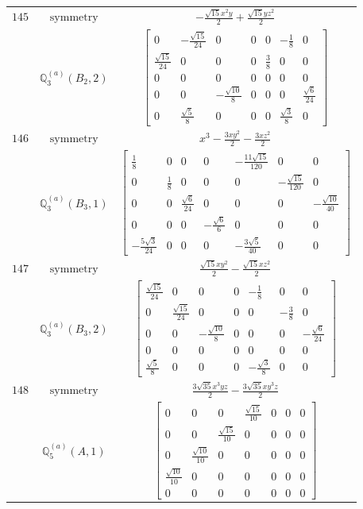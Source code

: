 \documentclass[fleqn,8pt,landscape]{jsarticle}
\begin{document}
\begin{longtable}{ccc}
$ 145 $ & $ \text{symmetry} $ & $ - \frac{\sqrt{15} x^{2} y}{2} + \frac{\sqrt{15} y z^{2}}{2} $ \\
$  $ & $ \mathbb{Q}_{3}^{(a)}(B_{2},2) $ & $ \begin{bmatrix} 0 & - \frac{\sqrt{15}}{24} & 0 & 0 & 0 & - \frac{1}{8} & 0 \\ \frac{\sqrt{15}}{24} & 0 & 0 & 0 & \frac{3}{8} & 0 & 0 \\ 0 & 0 & 0 & 0 & 0 & 0 & 0 \\ 0 & 0 & - \frac{\sqrt{10}}{8} & 0 & 0 & 0 & \frac{\sqrt{6}}{24} \\ 0 & \frac{\sqrt{5}}{8} & 0 & 0 & 0 & \frac{\sqrt{3}}{8} & 0 \end{bmatrix} $ \\ \hline
$ 146 $ & $ \text{symmetry} $ & $ x^{3} - \frac{3 x y^{2}}{2} - \frac{3 x z^{2}}{2} $ \\
$  $ & $ \mathbb{Q}_{3}^{(a)}(B_{3},1) $ & $ \begin{bmatrix} \frac{1}{8} & 0 & 0 & 0 & - \frac{11 \sqrt{15}}{120} & 0 & 0 \\ 0 & \frac{1}{8} & 0 & 0 & 0 & - \frac{\sqrt{15}}{120} & 0 \\ 0 & 0 & \frac{\sqrt{6}}{24} & 0 & 0 & 0 & - \frac{\sqrt{10}}{40} \\ 0 & 0 & 0 & - \frac{\sqrt{6}}{6} & 0 & 0 & 0 \\ - \frac{5 \sqrt{3}}{24} & 0 & 0 & 0 & - \frac{3 \sqrt{5}}{40} & 0 & 0 \end{bmatrix} $ \\ \hline
$ 147 $ & $ \text{symmetry} $ & $ \frac{\sqrt{15} x y^{2}}{2} - \frac{\sqrt{15} x z^{2}}{2} $ \\
$  $ & $ \mathbb{Q}_{3}^{(a)}(B_{3},2) $ & $ \begin{bmatrix} \frac{\sqrt{15}}{24} & 0 & 0 & 0 & - \frac{1}{8} & 0 & 0 \\ 0 & \frac{\sqrt{15}}{24} & 0 & 0 & 0 & - \frac{3}{8} & 0 \\ 0 & 0 & - \frac{\sqrt{10}}{8} & 0 & 0 & 0 & - \frac{\sqrt{6}}{24} \\ 0 & 0 & 0 & 0 & 0 & 0 & 0 \\ \frac{\sqrt{5}}{8} & 0 & 0 & 0 & - \frac{\sqrt{3}}{8} & 0 & 0 \end{bmatrix} $ \\ \hline
$ 148 $ & $ \text{symmetry} $ & $ \frac{3 \sqrt{35} x^{3} y z}{2} - \frac{3 \sqrt{35} x y^{3} z}{2} $ \\
$  $ & $ \mathbb{Q}_{5}^{(a)}(A,1) $ & $ \begin{bmatrix} 0 & 0 & 0 & \frac{\sqrt{15}}{10} & 0 & 0 & 0 \\ 0 & 0 & \frac{\sqrt{15}}{10} & 0 & 0 & 0 & 0 \\ 0 & \frac{\sqrt{10}}{10} & 0 & 0 & 0 & 0 & 0 \\ \frac{\sqrt{10}}{10} & 0 & 0 & 0 & 0 & 0 & 0 \\ 0 & 0 & 0 & 0 & 0 & 0 & 0 \end{bmatrix} $ \\ \hline

\end{longtable}
\end{document}
